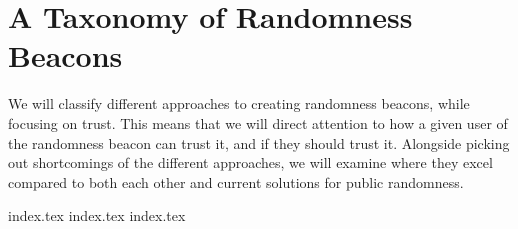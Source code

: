 \section{A Taxonomy of Randomness Beacons}
\label{sec:a_taxonomy_of_randomness_beacons}
We will classify different approaches to creating randomness beacons, while focusing on trust.
This means that we will direct attention to how a given user of the randomness beacon can trust it, and if they should trust it.
Alongside picking out shortcomings of the different approaches, we will examine where they excel compared to both each other and current solutions for public randomness.

{index.tex}
{index.tex}
{index.tex}
